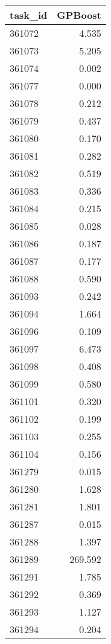 \begin{tabular}{lr}
\toprule
task\_id & GPBoost \\
\midrule
361072 & 4.535 \\
361073 & 5.205 \\
361074 & 0.002 \\
361077 & 0.000 \\
361078 & 0.212 \\
361079 & 0.437 \\
361080 & 0.170 \\
361081 & 0.282 \\
361082 & 0.519 \\
361083 & 0.336 \\
361084 & 0.215 \\
361085 & 0.028 \\
361086 & 0.187 \\
361087 & 0.177 \\
361088 & 0.590 \\
361093 & 0.242 \\
361094 & 1.664 \\
361096 & 0.109 \\
361097 & 6.473 \\
361098 & 0.408 \\
361099 & 0.580 \\
361101 & 0.320 \\
361102 & 0.199 \\
361103 & 0.255 \\
361104 & 0.156 \\
361279 & 0.015 \\
361280 & 1.628 \\
361281 & 1.801 \\
361287 & 0.015 \\
361288 & 1.397 \\
361289 & 269.592 \\
361291 & 1.785 \\
361292 & 0.369 \\
361293 & 1.127 \\
361294 & 0.204 \\
\bottomrule
\end{tabular}

